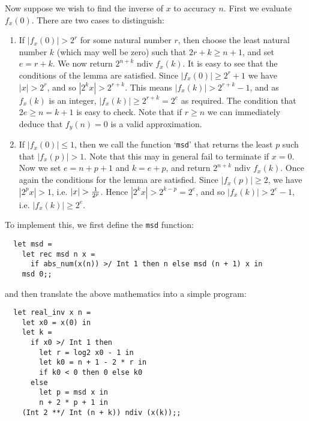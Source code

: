 Now suppose we wish to find the inverse of $x$ to accuracy $n$. First we
evaluate $f_x(0)$. There are two cases to distinguish:

\begin{enumerate}

\item If $|f_x(0)| > 2^r$ for some natural number $r$, then choose the least
natural number $k$ (which may well be zero) such that $2 r + k \geq n + 1$, and
set $e = r + k$. We now return $2^{n+k} \mbox{ ndiv } f_x(k)$. It is easy to
see that the conditions of the lemma are satisfied. Since $|f_x(0)| \geq 2^r +
1$ we have $|x| > 2^r$, and so $|2^k x| > 2^{r + k}$. This means $|f_x(k)| >
2^{r+k} - 1$, and as $f_x(k)$ is an integer, $|f_x(k)| \geq 2^{r + k} = 2^e$ as
required. The condition that $2 e \geq n = k + 1$ is easy to check. Note that
if $r \geq n$ we can immediately deduce that $f_y(n) = 0$ is a valid
approximation.

\item If $|f_x(0)| \leq 1$, then we call the function `{\tt msd}' that returns
the least $p$ such that $|f_x(p)| > 1$. Note that this may in general fail to
terminate if $x = 0$. Now we set $e = n + p + 1$ and $k = e + p$, and return
$2^{n+k} \mbox{ ndiv } f_x(k)$. Once again the conditions for the lemma are
satisfied. Since $|f_x(p)| \geq 2$, we have $|2^p x| > 1$, i.e. $|x| > {1 \over
{2^p}}$. Hence $|2^k x| > 2^{k-p} = 2^e$, and so $|f_x(k)| > 2^e - 1$, i.e.
$|f_x(k)| \geq 2^e$.

\end{enumerate}

\noindent To implement this, we first define the {\tt msd} function:

\begin{boxed}\begin{verbatim}
  let msd =
    let rec msd n x =
      if abs_num(x(n)) >/ Int 1 then n else msd (n + 1) x in
    msd 0;;
\end{verbatim}\end{boxed}

\noindent and then translate the above mathematics into a simple program:

\begin{boxed}\begin{verbatim}
  let real_inv x n =
    let x0 = x(0) in
    let k =
      if x0 >/ Int 1 then
        let r = log2 x0 - 1 in
        let k0 = n + 1 - 2 * r in
        if k0 < 0 then 0 else k0
      else
        let p = msd x in
        n + 2 * p + 1 in
    (Int 2 **/ Int (n + k)) ndiv (x(k));;
\end{verbatim}\end{boxed}

